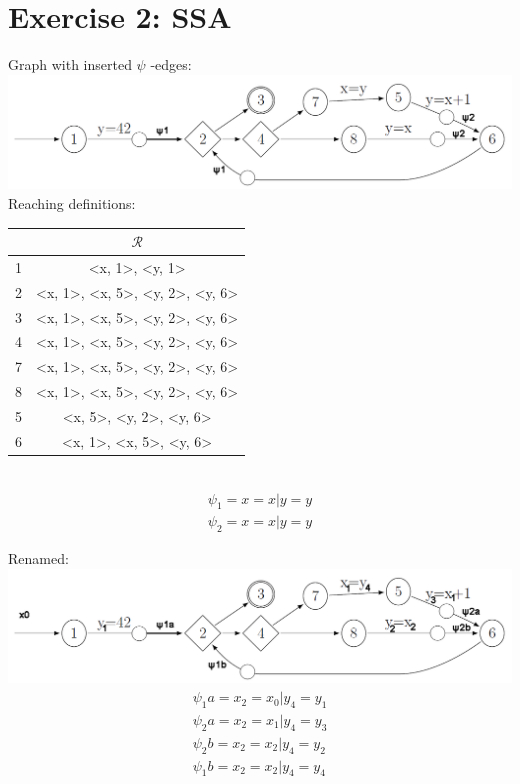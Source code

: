 \documentclass[11pt,a4paper]{scrartcl}
\begin{document}
\section*{Exercise 2: SSA}
Graph with inserted $\psi$ -edges:\\
\includegraphics[scale=.35]{2a}\\
Reaching definitions:\\
\begin{tabular}{|c|c|}
\hline
& $\mathcal{R}$ \\
\hline
1 & <x, 1>, <y, 1> \\
2 & <x, 1>, <x, 5>, <y, 2>, <y, 6> \\
3 & <x, 1>, <x, 5>, <y, 2>, <y, 6> \\
4 & <x, 1>, <x, 5>, <y, 2>, <y, 6> \\
7 & <x, 1>, <x, 5>, <y, 2>, <y, 6> \\
8 & <x, 1>, <x, 5>, <y, 2>, <y, 6> \\
5 & <x, 5>, <y, 2>, <y, 6> \\
6 & <x, 1>, <x, 5>, <y, 6> \\
\hline
\end{tabular}\\
\begin{align*}
\psi_1 = x = x | y = y \\
\psi_2 = x = x | y = y
\end{align*}

Renamed:\\
\includegraphics[scale=.35]{2b}\\
\begin{align*}
\psi_1a = x_2 = x_0 | y_4 = y_1 \\
\psi_2a = x_2 = x_1 | y_4 = y_3 \\
\psi_2b = x_2 = x_2 | y_4 = y_2 \\
\psi_1b = x_2 = x_2 | y_4 = y_4 \\
\end{align*}
\end{document}
